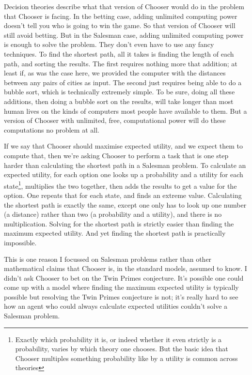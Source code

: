 \documentclass[
  11pt,
  letterpaper,
  DIV=11,
  numbers=noendperiod,
  twoside]{scrartcl}
\begin{document}
Decision theories describe what that version of Chooser would do in the
problem that Chooser is facing. In the betting case, adding unlimited
computing power doesn't tell you who is going to win the game. So that
version of Chooser will still avoid betting. But in the Salesman case,
adding unlimited computing power is enough to solve the problem. They
don't even have to use any fancy techniques. To find the shortest path,
all it takes is finding the length of each path, and sorting the
results. The first requires nothing more that addition; at least if, as
was the case here, we provided the computer with the distances between
any pairs of cities as input. The second just requires being able to do
a bubble sort, which is technically extremely simple. To be sure, doing
all these additions, then doing a bubble sort on the results, will take
longer than most human lives on the kinds of computers most people have
available to them. But a version of Chooser with unlimited, free,
computational power will do these computations no problem at all.

If we say that Chooser should maximise expected utility, and we expect
them to compute that, then we're asking Chooser to perform a task that
is one step harder than calculating the shortest path in a Salesman
problem. To calculate an expected utility, for each option one looks up
a probability and a utility for each state\footnote{Exactly which
  probability it is, or indeed whether it even strictly is a
  probability, varies by which theory one chooses. But the basic idea
  that Chooser multiples something probability like by a utility is
  common across theories}, multiplies the two together, then adds the
results to get a value for the option. One repeats that for each state,
and finds an extreme value. Calculating the shortest path is exactly the
same, except one only has to look up one number (a distance) rather than
two (a probability and a utility), and there is no multiplication.
Solving for the shortest path is strictly easier than finding the
maximum expected utility. And yet finding the shortest path is
practically impossible.

This is one reason I focussed on Salesman problems rather than other
mathematical claims that Chooser is, in the standard models, assumed to
know. I didn't ask Chooser to bet on the Twin Primes conjecture. It's
possible one could come up with a model where finding the maximum
expected utility is typically possible but resolving the Twin Primes
conjecture is not; it's really hard to see how an agent who could always
calculate expected utilities couldn't solve a Salesman problem.
\end{document}
